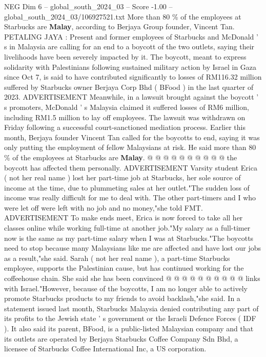 \begin{textsample}{NEG Dim 6 – global\_south\_2024\_03 – Score -1.00 – global\_south\_2024\_03/106927521.txt}  \label{ex:f6_neg_388}
More than 80 \% of the employees at Starbucks are \textbf{Malay}, according to Berjaya Group founder, Vincent Tan.
PETALING JAYA : Present and former employees of Starbucks and McDonald ' s in Malaysia are calling for an end to a boycott of the two outlets, saying their livelihoods have been severely impacted by it.
The boycott, meant to express solidarity with Palestinians following sustained military action by Israel in Gaza since Oct 7, is said to have contributed significantly to losses of RM116.32 million suffered by Starbucks owner Berjaya Corp Bhd ( BFood ) in the last quarter of 2023.
ADVERTISEMENT Meanwhile, in a lawsuit brought against the boycott ' s promoters, McDonald ' s Malaysia claimed it suffered losses of RM6 million, including RM1.5 million to lay off employees.
The lawsuit was withdrawn on Friday following a successful court-sanctioned mediation process.
Earlier this month, Berjaya founder Vincent Tan called for the boycotts to end, saying it was only putting the employment of fellow Malaysians at risk.
He said more than 80 \% of the employees at Starbucks are \textbf{Malay}. @ @ @ @ @ @ @ @ @ @ the boycott has affected them personally.
ADVERTISEMENT Varsity student Erica ( not her real name ) lost her part-time job at Starbucks, her sole source of income at the time, due to plummeting sales at her outlet."The sudden loss of income was really difficult for me to deal with.
The other part-timers and I who were let off were left with no job and no money,"she told FMT.
ADVERTISEMENT To make ends meet, Erica is now forced to take all her classes online while working full-time at another job."My salary as a full-timer now is the same as my part-time salary when I was at Starbucks."The boycotts need to stop because many Malaysians like me are affected and have lost our jobs as a result,"she said.
Sarah ( not her real name ), a part-time Starbucks employee, supports the Palestinian cause, but has continued working for the coffeehouse chain.
She said she has been convinced @ @ @ @ @ @ @ @ @ @ links with Israel."However, because of the boycotts, I am no longer able to actively promote Starbucks products to my friends to avoid backlash,"she said.
In a statement issued last month, Starbucks Malaysia denied contributing any part of its profits to the Jewish state ' s government or the Israeli Defence Forces ( IDF ).
It also said its parent, BFood, is a public-listed Malaysian company and that its outlets are operated by Berjaya Starbucks Coffee Company Sdn Bhd, a licensee of Starbucks Coffee International Inc, a US corporation.

\end{textsample}
